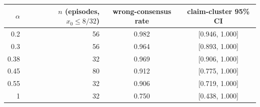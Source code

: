 \begin{tabular}{rrcc}
\toprule
$\alpha$ & $n$ (episodes, $x_0\le 8/32$) & wrong-consensus rate & claim-cluster 95\% CI \\
\midrule
0.2 & 56 & 0.982 & [0.946, 1.000] \\
0.3 & 56 & 0.964 & [0.893, 1.000] \\
0.38 & 32 & 0.969 & [0.906, 1.000] \\
0.45 & 80 & 0.912 & [0.775, 1.000] \\
0.55 & 32 & 0.906 & [0.719, 1.000] \\
1 & 32 & 0.750 & [0.438, 1.000] \\
\bottomrule
\end{tabular}
